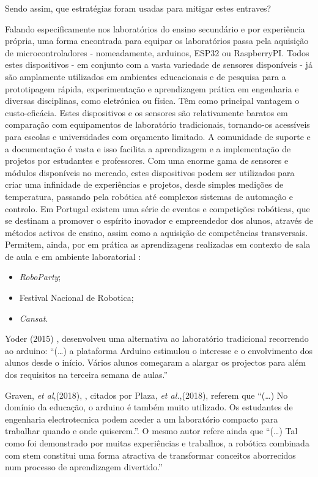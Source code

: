 Sendo assim, que estratégias foram usadas para mitigar estes entraves?

Falando especificamente nos laboratórios do ensino secundário e por experiência própria, uma forma encontrada para equipar os laboratórios passa pela aquisição de \acrfull{microcontroladores} -  nomeadamente, \gls{arduino}s, \gls{ESP32} ou \gls{RaspberryPI}. Todos estes dispositivos - em conjunto com a vasta variedade de sensores disponíveis - já são amplamente utilizados em ambientes educacionais e de pesquisa para a prototipagem rápida, experimentação e aprendizagem prática em engenharia e diversas disciplinas, como eletrónica ou física. Têm como principal vantagem o custo-eficácia. Estes dispositivos e os sensores são relativamente baratos em comparação com equipamentos de laboratório tradicionais, tornando-os acessíveis para escolas e universidades com orçamento limitado. A comunidade de suporte e a documentação é vasta e isso facilita a aprendizagem e a implementação de projetos por estudantes e professores. Com uma enorme gama de sensores e módulos disponíveis no mercado, estes dispositivos podem ser utilizados para criar uma infinidade de experiências e projetos, desde simples medições de temperatura, passando pela robótica até complexos sistemas de automação e controlo.
Em Portugal existem uma série de eventos e competições robóticas, que se destinam a promover o espírito inovador e empreendedor dos alunos, através de métodos activos de ensino, assim como a aquisição de competências transversais. Permitem, ainda, por em prática as aprendizagens realizadas em contexto de sala de aula e em ambiente laboratorial \cite{roboparty}\cite{fnr}\cite{cansat}:
\begin{itemize}
    \item \textit{RoboParty};
    \item Festival Nacional de Robotica;
    \item \textit{Cansat}.
\end{itemize}

Yoder (2015) \cite{yoder}, desenvolveu uma alternativa ao laboratório tradicional recorrendo ao \gls{arduino}: ``(\dots) a plataforma Arduino estimulou o interesse e o envolvimento dos alunos desde o início. Vários alunos começaram a alargar os projectos para além dos requisitos na terceira semana de aulas.''

Graven, \textit{et al},(2018), \cite{graven}, citados por Plaza, \textit{et al.},(2018), \cite{plaza} referem que ``(\ldots) No domínio da educação, o \gls{arduino} é também muito utilizado. Os estudantes de engenharia electrotecnica podem aceder a um laboratório compacto para trabalhar quando e onde quiserem.''. O mesmo autor refere ainda que ``(\ldots) Tal como foi demonstrado por muitas experiências e trabalhos, a robótica combinada com \acrshort{stem} constitui uma forma atractiva de transformar conceitos aborrecidos num processo de aprendizagem divertido.''

